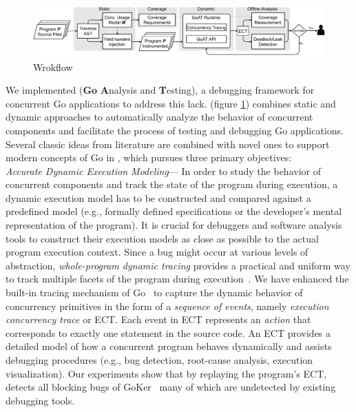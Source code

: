\begin{figure}[]
\centering
\includegraphics[width=0.99\linewidth]{figs/GOAT_overview.pdf}
\caption{\goat Wrokflow}
\label{fig:goat_workflow}
\end{figure}


We implemented \goat (\textbf{Go} \textbf{A}nalysis and \textbf{T}esting), a debugging framework for concurrent Go applications to address this lack.
%
\goat (figure \ref{fig:goat_workflow}) combines static and dynamic approaches to automatically analyze the behavior of concurrent components and facilitate the process of testing and debugging Go applications.
%
Several classic ideas from literature are combined with novel ones to support modern concepts of Go in \goat, which pursues three primary objectives:
\\
 \textit{Accurate Dynamic Execution Modeling}---
In order to study the behavior of concurrent components and track the state of the program during execution, a dynamic execution model has to be constructed and compared against a predefined model (e.g., formally defined specifications or the developer's mental representation of the program).
%
It is crucial for debuggers and software analysis tools to construct their execution models as close as possible to the actual program execution context.
%
Since a bug might occur at various levels of abstraction, \textit{whole-program dynamic tracing} provides a practical and uniform way to track multiple facets of the program during execution~\cite{difftrace}.
%
We have enhanced the built-in tracing mechanism of Go~\cite{ect-arxiv} to capture the dynamic behavior of concurrency primitives in the form of a \textit{sequence of events}, namely \textit{execution concurrency trace} or ECT.
%
Each event in ECT represents an \textit{action} that corresponds to exactly one statement in the source code.
%
An ECT provides a detailed model of how a concurrent program behaves dynamically and assists debugging procedures (e.g., bug detection, root-cause analysis, execution visualization).
%
Our experiments show that by replaying the program's ECT, \goat detects all blocking bugs of GoKer~\cite{yuan-gobench-cgo21} many of which are undetected by existing debugging tools.
